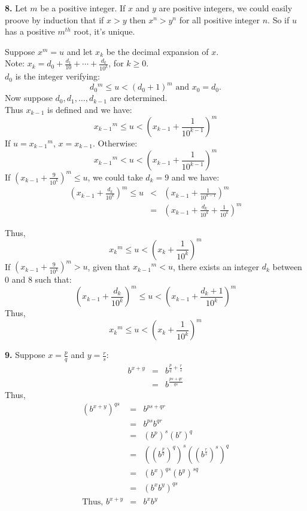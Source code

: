 \documentclass[a4paper,12pt]{article}
\newcommand{\newpar}[1]{\bigskip \noindent \textbf{#1.}}
\begin{document}
\newpar{8} Let $m$ be a positive integer.  If $x$ and $y$ are positive
integers, we could easily proove by induction that if $x > y$ then
$x^n > y^n$ for all positive integer $n$.  So if $u$ has a positive $m^{th}$
root, it's unique.

\medskip
Suppose $x^m = u$ and let $x_k$ be the decimal expansion of $x$.\\
Note: $x_k = d_0 + \frac{d_1}{10} + \cdots + \frac{d_k}{10^k}$, for $k \ge 0$.\\
$d_0$ is the integer verifying:
\[ d_0{}^m \le u < (d_0 + 1)^m \mbox{ and } x_0 = d_0.\]
Now suppose $d_0, d_1, \ldots, d_{k-1}$ are determined.\\
Thus $x_{k-1}$ is defined and we have:
\[ x_{k-1}{}^m \le u < \left(x_{k-1} + \frac{1}{10^{k-1}}\right)^m \]
If $u = x_{k-1}{}^m$, $x = x_{k-1}$. Otherwise:
\[ x_{k-1}{}^m < u < \left(x_{k-1} + \frac{1}{10^{k-1}}\right)^m \]
If $(x_{k-1} + \frac{9}{10^k})^m \le u$, we could take $d_k = 9$ and we have:
\begin{eqnarray*}
\left(x_{k-1} + \frac{d_k}{10^k}\right)^m \le u & < & 
\left(x_{k-1} + \frac{1}{10^{k-1}}\right)^m \\
& = & \left(x_{k-1} + \frac{d_k}{10^k} + \frac{1}{10^k}\right)^m
\end{eqnarray*}

Thus,
\[ x_k{}^m \le u < \left(x_k + \frac{1}{10^k}\right)^m \]
If $(x_{k-1} + \frac{9}{10^k})^m > u$, given that $x_{k-1}{}^m < u$, there 
exists an integer $d_k$ between $0$ and $8$ such that:
\[ \left(x_{k-1} + \frac{d_k}{10^k}\right)^m \le u < 
\left(x_{k-1} + \frac{d_k+1}{10^k}\right)^m \]
Thus,
\[ x_k{}^m \le u < \left(x_k + \frac{1}{10^k}\right)^m \]

\newpar{9} Suppose $x = \frac{p}{q}$ and $y = \frac{r}{s}$:
\begin{eqnarray*}
b^{x+y} & = & b^{\frac{p}{q} + \frac{r}{s}}\\
& = & b^{\frac{ps + qr}{qs}}
\end{eqnarray*}
Thus,
\begin{eqnarray*}
(b^{x+y})^{qs} & = & b^{ps+qr}\\
& = & b^{ps} b^{qr}\\
& = & (b^p)^s (b^r)^q\\
& = & ((b^{\frac{p}{q}})^q)^s ((b^{\frac{r}{s}})^s)^q\\
& = & (b^x)^{qs} (b^y)^{sq}\\
& = & (b^x b^y)^{qs}\\
\mbox{Thus, }b^{x+y} & = & b^x b^y
\end{eqnarray*}
\end{document}
